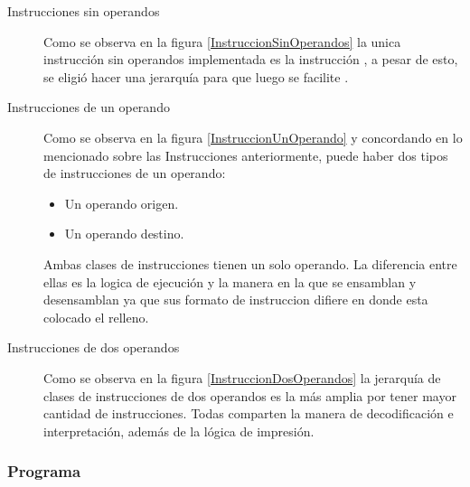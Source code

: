 \begin{description}
\item[Instrucciones sin operandos] Como se observa en la figura \ref{InstruccionSinOperandos} la unica instrucción sin operandos implementada es la instrucción , a pesar de esto, se eligió hacer una jerarquía para que luego se facilite  .


\item[Instrucciones de un operando] 
Como se observa en la figura \ref{InstruccionUnOperando} y concordando en lo mencionado sobre las Instrucciones anteriormente, puede haber dos tipos de instrucciones de un operando:

\begin{itemize}
\item Un operando origen.
\item Un operando destino.
\end{itemize}

Ambas clases de instrucciones tienen un solo operando. La diferencia entre ellas es la logica de ejecución y la manera en la que se ensamblan y desensamblan ya que sus formato de instruccion difiere en donde esta colocado el relleno.



\item[Instrucciones de dos operandos]

Como se observa en la figura \ref{InstruccionDosOperandos} la jerarquía de clases de instrucciones de dos operandos es la más amplia por tener mayor cantidad de instrucciones. Todas comparten la manera de decodificación e interpretación, además de la lógica de impresión.


\end{description}




\subsubsection{Programa}


